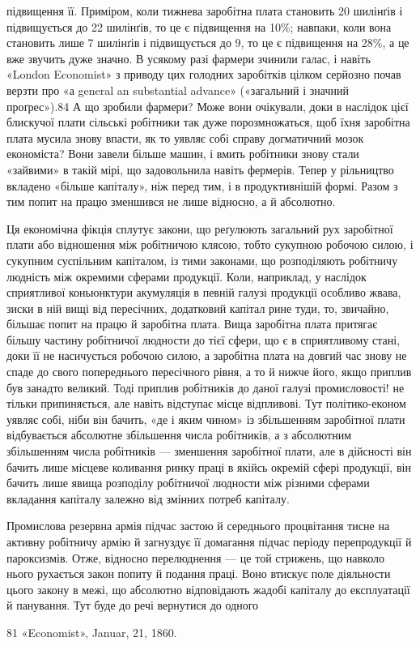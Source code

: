 \parcont{}  %
підвищення її. Приміром, коли тижнева заробітна плата становить
20 шилінґів і підвищується до 22 шилінґів, то це є підвищення
на 10\%; навпаки, коли вона становить лише 7 шилінґів
і підвищується до 9, то це є підвищення на 28\%, а це вже
звучить дуже значно. В усякому разі фармери зчинили галас,
і навіть «London Economist» з приводу цих голодних заробітків
цілком серйозно почав верзти про «а general an substantial
advance» («загальний і значний проґрес»).84 А що зробили
фармери? Може вони очікували, доки в наслідок цієї блискучої
плати сільські робітники так дуже порозмножаться, щоб їхня
заробітна плата мусила знову впасти, як то уявляє собі справу
догматичний мозок економіста? Вони завели більше машин,
і вмить робітники знову стали «зайвими» в такій мірі, що задовольнила
навіть фермерів. Тепер у рільництво вкладено
«більше капіталу», ніж перед тим, і в продуктивнішій формі.
Разом з тим попит на працю зменшився не лише відносно,
а й абсолютно.

Ця економічна фікція сплутує закони, що реґулюють загальний
рух заробітної плати або відношення між робітничою клясою,
тобто сукупною робочою силою, і сукупним суспільним капіталом,
із тими законами, що розподіляють робітничу людність
між окремими сферами продукції. Коли, наприклад, у наслідок
сприятливої коньюнктури акумуляція в певній галузі продукції
особливо жвава, зиски в ній вищі від пересічних, додатковий
капітал рине туди, то, звичайно, більшає попит на працю й заробітна
плата. Вища заробітна плата притягає більшу частину
робітничої людности до тієї сфери, що є в сприятливому стані,
доки її не насичується робочою силою, а заробітна плата на довгий
час знову не спаде до свого попереднього пересічного рівня,
а то й нижче його, якщо приплив був занадто великий. Тоді
приплив робітників до даної галузі промисловості! не тільки
припиняється, але навіть відступає місце відпливові. Тут політико-економ
уявляє собі, ніби він бачить, «де і яким чином»
із збільшенням заробітної плати відбувається абсолютне збільшення
числа робітників, а з абсолютним збільшенням числа робітників
— зменшення заробітної плати, але в дійсності він бачить
лише місцеве коливання ринку праці в якійсь окремій сфері
продукції, він бачить лише явища розподілу робітничої людности
між різними сферами вкладання капіталу залежно від змінних
потреб капіталу.

Промислова резервна армія підчас застою й середнього процвітання
тисне на активну робітничу армію й загнуздує її домагання
підчас періоду перепродукції й пароксизмів. Отже, відносно
перелюднення — це той стрижень, що навколо нього рухається
закон попиту й подання праці. Воно втискує поле діяльности
цього закону в межі, що абсолютно відповідають жадобі капіталу
до експлуатації й панування. Тут буде до речі вернутися до одного

81 «Economist», Januar, 21, 1860.
\parbreak{}  %
